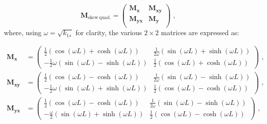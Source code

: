 \begin{equation}
    \mathbf{M}_\mathrm{skew\ quad.} = \begin{pmatrix}
        \mathbf{M_x}    & \mathbf{M_{xy}}  \\
        \mathbf{M_{yx}} & \mathbf{M_y}   \\
    \end{pmatrix} \text{ ,}
    \label{equation:skew_quad_transfer_matrix}
\end{equation}
where, using \(\omega = \sqrt{k_{1s}}\) for clarity, the various \(2 \times 2\) matrices are expressed as:

\begin{equation}
    \begin{aligned}
        \mathbf{M_x} &= \begin{pmatrix}
            \frac{1}{2} \left( \cos \left(\omega L\right) + \cosh \left(\omega L\right)\right)                 &  \frac{1}{2 \omega} \left( \sin \left(\omega L\right) + \sinh \left(\omega L\right)\right) \\
            -\frac{1}{2} \omega \left( \sin \left(\omega L\right) - \sinh \left(\omega L\right)\right)  &  \frac{1}{2} \left( \cos \left(\omega L\right) + \cosh \left(\omega L\right) \right)
        \end{pmatrix} \text{ ,} \\
        \mathbf{M_{xy}} &= \begin{pmatrix}
            \frac{1}{2} \left( \cos \left(\omega L\right) - \cosh \left(\omega L\right)\right)                &  \frac{1}{2 \omega} \left( \sin \left(\omega L\right) - \sinh \left(\omega L\right)\right) \\
            -\frac{1}{2} \omega \left( \sin \left(\omega L\right) + \sinh \left(\omega L\right)\right)  &  \frac{1}{2} \left( \cos \left(\omega L\right) - \cosh \left(\omega L\right)\right)
        \end{pmatrix} \text{ ,} \\
        \mathbf{M_{yx}} &= \begin{pmatrix}
            \frac{1}{2} \left( \cos \left(\omega L\right) - \cosh \left(\omega L\right)\right)              &  \frac{1}{2 \omega} \left( \sin \left(\omega L\right) - \sinh \left(\omega L\right)\right) \\
            -\frac{\omega}{2} \left( \sin \left(\omega L\right) + \sinh \left(\omega L\right)\right)  &  \frac{1}{2} \left( \cos \left(\omega L\right) - \cosh \left(\omega L\right)\right)
        \end{pmatrix} \text{ ,} \\

\end{aligned}
\end{equation}
